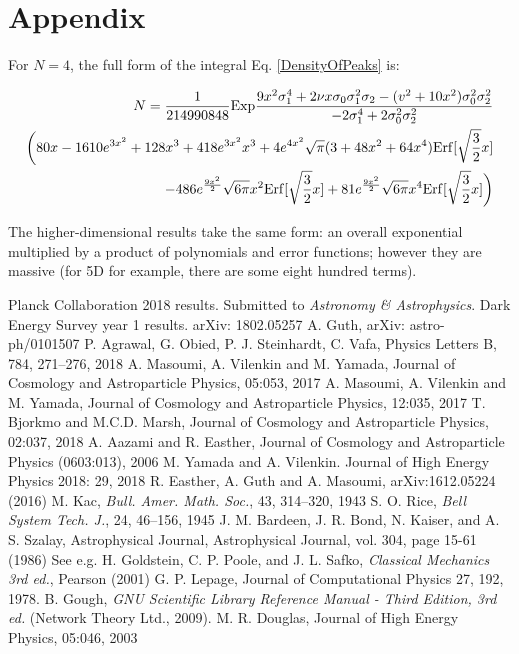 \documentclass[12pt]{article}
\begin{document}
\section{Appendix}
For $N=4$, the full form of the integral Eq. \ref{DensityOfPeaks} is:

\begin{equation}
\begin{split}
N = \frac{1}{214990848} \mathrm{Exp}\frac{9x^2\sigma_1^4 + 2\nu x \sigma_0 \sigma_1^2 \sigma_2 - (v^2+10x^2)\sigma_0^2\sigma_2^2}{-2\sigma_1^4+2\sigma_0^2\sigma_2^2}\\\bigg{(}80x - 1610e^{3x^2}+128x^3+418e^{3x^2}x^3+4e^{4x^2}\sqrt{\pi}(3+48x^2+64x^4)\mathrm{Erf}[\sqrt{\frac{3}{2}}x]\\
-486e^{\frac{9x^2}{2}}\sqrt{6\pi}x^2\mathrm{Erf}[\sqrt{\frac{3}{2}}x]+81e^{\frac{9x^2}{2}}\sqrt{6\pi}x^4\mathrm{Erf}[\sqrt{\frac{3}{2}}x]\bigg{)}
\end{split}
\end{equation}

The higher-dimensional results take the same form: an overall exponential multiplied by a product of polynomials and error functions; however they are massive (for 5D for example, there are some eight hundred terms).

\begin{thebibliography}{99}
 Planck Collaboration 2018 results. Submitted to \emph{Astronomy \& Astrophysics}.
 Dark Energy Survey year 1 results. arXiv: 1802.05257
 A. Guth, arXiv: astro-ph/0101507
 P. Agrawal, G. Obied, P. J. Steinhardt, C. Vafa, Physics Letters B, 784, 271--276, 2018
 A. Masoumi, A. Vilenkin and M. Yamada, Journal of Cosmology and Astroparticle Physics, 05:053, 2017
 A. Masoumi, A. Vilenkin and M. Yamada, Journal of Cosmology and Astroparticle Physics, 12:035, 2017
 T. Bjorkmo and M.C.D. Marsh, Journal of Cosmology and Astroparticle Physics, 02:037, 2018
 A. Aazami and R. Easther, Journal of Cosmology and Astroparticle Physics (0603:013), 2006
 M. Yamada and A. Vilenkin. Journal of High Energy Physics 2018: 29, 2018
 R. Easther, A. Guth and A. Masoumi, arXiv:1612.05224 (2016)
 M. Kac, \emph{Bull. Amer. Math. Soc.}, 43, 314–320, 1943
  S. O. Rice, \emph{Bell System Tech. J.}, 24, 46--156, 1945
 J. M. Bardeen, J. R. Bond, N. Kaiser, and A. S. Szalay, Astrophysical Journal, Astrophysical Journal, vol. 304, page 15-61 (1986)
 See e.g. H. Goldstein, C. P. Poole, and J. L. Safko, \emph{Classical Mechanics 3rd ed.}, Pearson (2001)
 G. P. Lepage, Journal of Computational Physics 27, 192, 1978.
 B. Gough, \emph{GNU Scientific Library Reference Manual - Third Edition, 3rd ed.} (Network Theory Ltd., 2009).
 M. R. Douglas, Journal of High Energy Physics, 05:046, 2003
\end{thebibliography}
\end{document}
